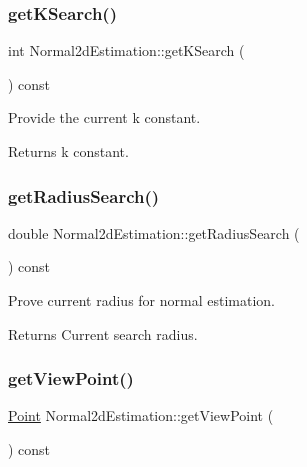 \subsubsection{\texorpdfstring{get\+K\+Search()}{getKSearch()}}
{\footnotesize\ttfamily int Normal2d\+Estimation\+::get\+K\+Search (\begin{DoxyParamCaption}{ }\end{DoxyParamCaption}) const\hspace{0.3cm}{\ttfamily [inline]}}



Provide the current k constant. 

\begin{DoxyReturn}{Returns}
k constant. 
\end{DoxyReturn}
\mbox{\label{classNormal2dEstimation_a2b25a3efe493da9995622279e3a21437}} 
\subsubsection{\texorpdfstring{get\+Radius\+Search()}{getRadiusSearch()}}
{\footnotesize\ttfamily double Normal2d\+Estimation\+::get\+Radius\+Search (\begin{DoxyParamCaption}{ }\end{DoxyParamCaption}) const\hspace{0.3cm}{\ttfamily [inline]}}



Prove current radius for normal estimation. 

\begin{DoxyReturn}{Returns}
Current search radius. 
\end{DoxyReturn}
\mbox{\label{classNormal2dEstimation_a9a8b5ac0f03023a476f7986cf06c8f96}} 
\subsubsection{\texorpdfstring{get\+View\+Point()}{getViewPoint()}}
{\footnotesize\ttfamily \hyperlink{Normal2dEstimation_8h_ab8d898f36957cca40634530a6f118a3e}{Point} Normal2d\+Estimation\+::get\+View\+Point (\begin{DoxyParamCaption}{ }\end{DoxyParamCaption}) const\hspace{0.3cm}{\ttfamily [inline]}}



